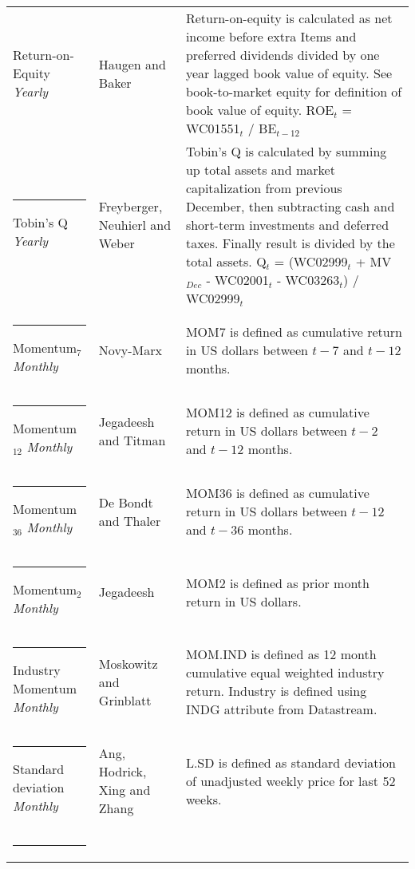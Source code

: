 \documentclass[12pt]{article}
\begin{document}
{{\begin{xltabular}{\textwidth}{ >{\raggedright\arraybackslash}p{0.23\textwidth} >{\raggedright\arraybackslash}p{0.2\textwidth} X}
Return-on-Equity \newline \emph{Yearly}		& Haugen and Baker \citeyearpar{HAUGEN1996}		& Return-on-equity is calculated as net income before extra Items and preferred dividends divided by one year lagged book value of equity. See book-to-market equity for definition of book value of equity. \newline ROE$_t$ = WC01551$_{t}$ / BE$_{t-12}$ \\ \rule{-1ex}{3ex}
Tobin's Q 	\newline \emph{Yearly}			& Freyberger, Neuhierl and Weber \citeyearpar{Freyberger2020} & Tobin's Q is calculated by summing up total assets and market capitalization from previous December, then subtracting cash and short-term investments and deferred taxes. Finally result is divided by the total assets. \newline Q$_t$ = (WC02999$_{t}$ + MV$_{Dec}$ - WC02001$_{t}$ - WC03263$_{t}$) / WC02999$_{t}$ \\ \rule{-1ex}{3ex}
Momentum$_{7}$ \newline \emph{Monthly}	& Novy-Marx \citeyearpar{NOVYMARX2012}			& MOM7 is defined as cumulative return in US dollars between $t-7$ and $t-12$ months.\\ \rule{-1ex}{3ex}
Momentum$_{12}$ \newline \emph{Monthly}	& Jegadeesh and Titman \citeyearpar{Jegadeesh1993}	& MOM12 is defined as cumulative return in US dollars between $t-2$ and $t-12$ months.\\ \rule{-1ex}{3ex}
Momentum$_{36}$ \newline \emph{Monthly}	& De Bondt and Thaler \citeyearpar{DeBondt1985}		& MOM36 is defined as cumulative return in US dollars between $t-12$ and $t-36$ months.\\ \rule{-1ex}{3ex}
Momentum$_{2}$ \newline \emph{Monthly}	& Jegadeesh \citeyearpar{Jegadeesh1990}			& MOM2 is defined as prior month return in US dollars.\\ \rule{-1ex}{3ex}
Industry Momentum \newline \emph{Monthly} 	& Moskowitz and Grinblatt \citeyearpar{Moskowitz1999}	& MOM.IND is defined as 12 month cumulative equal weighted industry return. Industry is defined using INDG attribute from Datastream. \\ \rule{-1ex}{3ex}
Standard deviation \newline \emph{Monthly}	& Ang, Hodrick, Xing and Zhang \citeyearpar{Ang2006}	& L.SD is defined as standard deviation of unadjusted weekly price for last 52 weeks. \\ \rule{-1ex}{3ex}

\end{xltabular}}}
\end{document}
